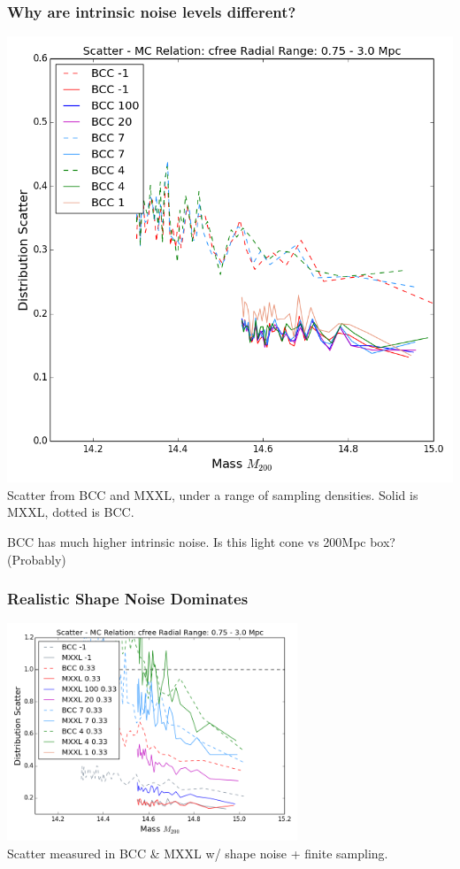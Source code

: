 \documentclass{beamer}
\begin{document}
\begin{frame}
\frametitle{Why are intrinsic noise levels different?}

\centering

\includegraphics[height=0.65\textheight]{../figures/density_cfree-r10_scatter}\\
\tiny{Scatter from BCC and MXXL, under a range of sampling densities. Solid is MXXL, dotted is BCC. }


\small{BCC has much higher intrinsic noise. Is this light cone vs 200Mpc box? (Probably)}

\end{frame}


\begin{frame}
\frametitle{Realistic Shape Noise Dominates}

\centering

\includegraphics[width=0.65\textwidth]{../figures/density_noise2_cfree-r10_scatter}\\

{\tiny Scatter measured in BCC \& MXXL w/ shape noise + finite sampling.}


\end{frame}
\end{document}
